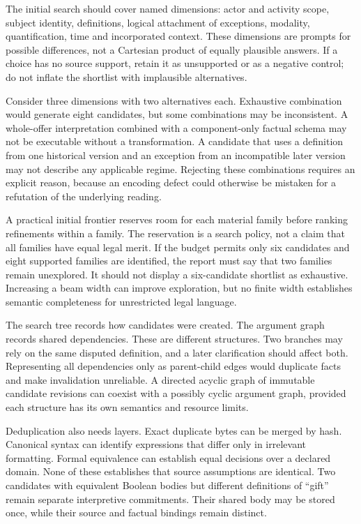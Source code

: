 The initial search should cover named dimensions: actor and activity scope,
subject identity, definitions, logical attachment of exceptions, modality,
quantification, time and incorporated context. These dimensions are prompts for
possible differences, not a Cartesian product of equally plausible answers. If a
choice has no source support, retain it as unsupported or as a negative control;
do not inflate the shortlist with implausible alternatives.

Consider three dimensions with two alternatives each. Exhaustive combination
would generate eight candidates, but some combinations may be inconsistent. A
whole-offer interpretation combined with a component-only factual schema may not
be executable without a transformation. A candidate that uses a definition from
one historical version and an exception from an incompatible later version may
not describe any applicable regime. Rejecting these combinations requires an
explicit reason, because an encoding defect could otherwise be mistaken for a
refutation of the underlying reading.


A practical initial frontier reserves room for each material family before
ranking refinements within a family. The reservation is a search policy, not a
claim that all families have equal legal merit. If the budget permits only six
candidates and eight supported families are identified, the report must say that
two families remain unexplored. It should not display a six-candidate shortlist
as exhaustive. Increasing a beam width can improve exploration, but no finite
width establishes semantic completeness for unrestricted legal language.

The search tree records how candidates were created. The argument graph records
shared dependencies. These are different structures. Two branches may rely on
the same disputed definition, and a later clarification should affect both.
Representing all dependencies only as parent-child edges would duplicate facts
and make invalidation unreliable. A directed acyclic graph of immutable candidate
revisions can coexist with a possibly cyclic argument graph, provided each
structure has its own semantics and resource limits.

Deduplication also needs layers. Exact duplicate bytes can be merged by hash.
Canonical syntax can identify expressions that differ only in irrelevant
formatting. Formal equivalence can establish equal decisions over a declared
domain. None of these establishes that source assumptions are identical. Two
candidates with equivalent Boolean bodies but different definitions of ``gift''
remain separate interpretive commitments. Their shared body may be stored once,
while their source and factual bindings remain distinct.


